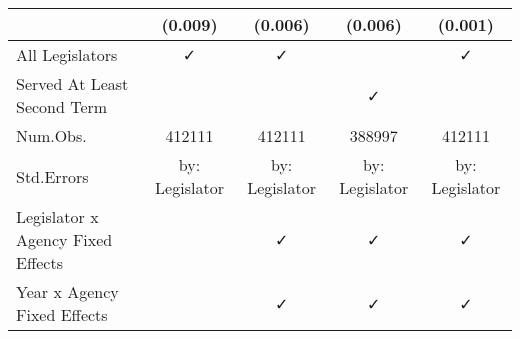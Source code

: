 \begin{table}
\begin{tabular}[t]{lcccc}
 & (\num{0.009}) & (\num{0.006}) & (\num{0.006}) & (\num{0.001})\\
\midrule
All Legislators & ✓ & ✓ &  & ✓\\
Served At Least Second Term &  &  & ✓ & \\
Num.Obs. & \num{412111} & \num{412111} & \num{388997} & \num{412111}\\
Std.Errors & by: Legislator & by: Legislator & by: Legislator & by: Legislator\\
Legislator x Agency Fixed Effects &  & ✓ & ✓ & ✓\\
Year x Agency Fixed Effects &  & ✓ & ✓ & ✓\\
\bottomrule
\end{tabular}
\end{table}
